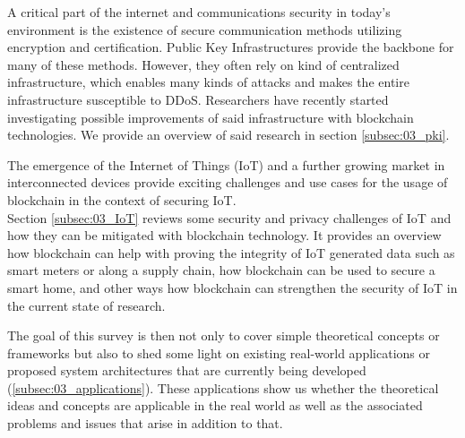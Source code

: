 A critical part of the internet and communications security in today's environment is the existence of secure communication methods utilizing encryption and certification. Public Key Infrastructures provide the backbone for many of these methods. However, they often rely on kind of centralized infrastructure, which enables many kinds of attacks and makes the entire infrastructure susceptible to DDoS. Researchers have recently started investigating possible improvements of said infrastructure with blockchain technologies. We provide an overview of said research in section \ref{subsec:03_pki}.

The emergence of the Internet of Things (IoT) and a further growing market in interconnected devices provide exciting challenges and use cases for the usage of blockchain in the context of securing IoT.\\
Section \ref{subsec:03_IoT} reviews some security and privacy challenges of IoT and how they can be mitigated with blockchain technology. It provides an overview how blockchain can help with proving the integrity of IoT generated data such as smart meters or along a supply chain, how blockchain can be used to secure a smart home, and other ways how blockchain can strengthen the security of IoT in the current state of research.

The goal of this survey is then not only to cover simple theoretical concepts or frameworks but also to shed some light on existing real-world applications or proposed system architectures that are currently being developed (\ref{subsec:03_applications}). These applications show us whether the theoretical ideas and concepts are applicable in the real world as well as the associated problems and issues that arise in addition to that.
